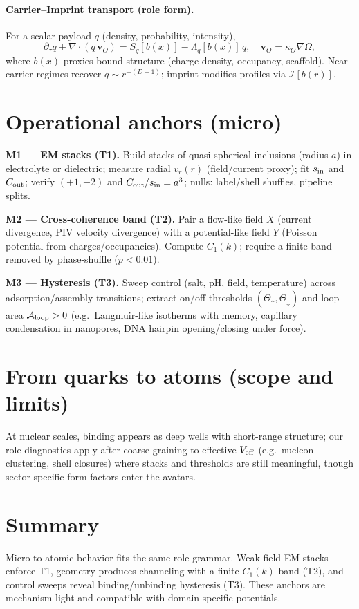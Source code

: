\documentclass[12pt,a4paper,oneside]{scrreprt}
\begin{document}
\paragraph{Carrier–Imprint transport (role form).}
For a scalar payload $q$ (density, probability, intensity),
\[
\partial_{\tau}q+\nabla\!\cdot(q\,\mathbf v_O)=S_q[b(x)]-\Lambda_q[b(x)]\,q,\quad \mathbf v_O=\kappa_O\nabla\Omega,
\]
where $b(x)$ proxies bound structure (charge density, occupancy, scaffold). Near-carrier regimes recover $q\!\sim\!r^{-(D-1)}$; imprint modifies profiles via $\mathcal I[b(r)]$.

\section{Operational anchors (micro)}\label{sec:micro-anchors}
\textbf{M1 — EM stacks (T1).} Build stacks of quasi-spherical inclusions (radius $a$) in electrolyte or dielectric; measure radial $v_r(r)$ (field/current proxy); fit $s_{\rm in}$ and $C_{\rm out}$; verify $(+1,-2)$ and $C_{\rm out}/s_{\rm in}=a^3$; nulls: label/shell shuffles, pipeline splits.

\textbf{M2 — Cross-coherence band (T2).} Pair a flow-like field $X$ (current divergence, PIV velocity divergence) with a potential-like field $Y$ (Poisson potential from charges/occupancies). Compute $C_1(k)$; require a finite band removed by phase-shuffle ($p<0.01$).

\textbf{M3 — Hysteresis (T3).} Sweep control (salt, pH, field, temperature) across adsorption/assembly transitions; extract on/off thresholds $(\Theta_\uparrow,\Theta_\downarrow)$ and loop area $\mathcal A_{\rm loop}>0$ (e.g.\ Langmuir-like isotherms with memory, capillary condensation in nanopores, DNA hairpin opening/closing under force).

\section{From quarks to atoms (scope and limits)}\label{sec:micro-scope}
At nuclear scales, binding appears as deep wells with short-range structure; our role diagnostics apply after coarse-graining to effective $V_{\rm eff}$ (e.g.\ nucleon clustering, shell closures) where stacks and thresholds are still meaningful, though sector-specific form factors enter the avatars.

\section*{Summary}
Micro-to-atomic behavior fits the same role grammar. Weak-field EM stacks enforce T1, geometry produces channeling with a finite $C_1(k)$ band (T2), and control sweeps reveal binding/unbinding hysteresis (T3). These anchors are mechanism-light and compatible with domain-specific potentials.
\end{document}
